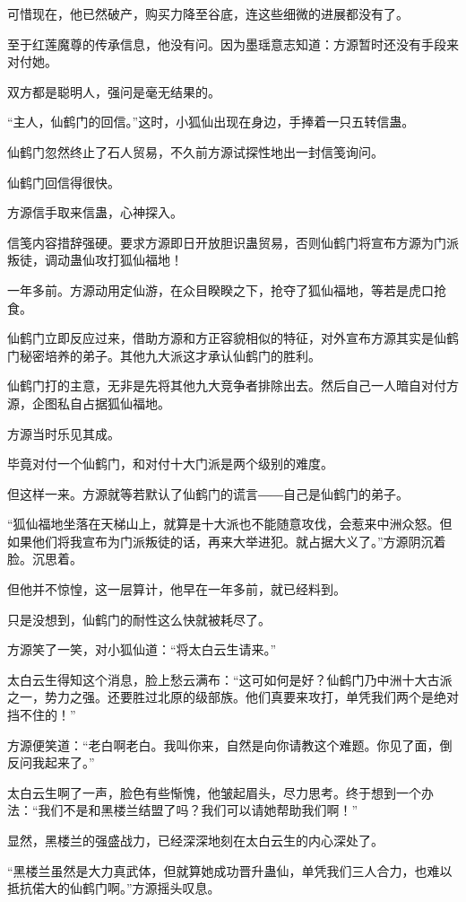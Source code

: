 \begin{this_body}
可惜现在，他已然破产，购买力降至谷底，连这些细微的进展都没有了。

至于红莲魔尊的传承信息，他没有问。因为墨瑶意志知道：方源暂时还没有手段来对付她。

双方都是聪明人，强问是毫无结果的。

“主人，仙鹤门的回信。”这时，小狐仙出现在身边，手捧着一只五转信蛊。

仙鹤门忽然终止了石人贸易，不久前方源试探性地出一封信笺询问。

仙鹤门回信得很快。

方源信手取来信蛊，心神探入。

信笺内容措辞强硬。要求方源即日开放胆识蛊贸易，否则仙鹤门将宣布方源为门派叛徒，调动蛊仙攻打狐仙福地！

一年多前。方源动用定仙游，在众目睽睽之下，抢夺了狐仙福地，等若是虎口抢食。

仙鹤门立即反应过来，借助方源和方正容貌相似的特征，对外宣布方源其实是仙鹤门秘密培养的弟子。其他九大派这才承认仙鹤门的胜利。

仙鹤门打的主意，无非是先将其他九大竞争者排除出去。然后自己一人暗自对付方源，企图私自占据狐仙福地。

方源当时乐见其成。

毕竟对付一个仙鹤门，和对付十大门派是两个级别的难度。

但这样一来。方源就等若默认了仙鹤门的谎言――自己是仙鹤门的弟子。

“狐仙福地坐落在天梯山上，就算是十大派也不能随意攻伐，会惹来中洲众怒。但如果他们将我宣布为门派叛徒的话，再来大举进犯。就占据大义了。”方源阴沉着脸。沉思着。

但他并不惊惶，这一层算计，他早在一年多前，就已经料到。

只是没想到，仙鹤门的耐性这么快就被耗尽了。

方源笑了一笑，对小狐仙道：“将太白云生请来。”

太白云生得知这个消息，脸上愁云满布：“这可如何是好？仙鹤门乃中洲十大古派之一，势力之强。还要胜过北原的级部族。他们真要来攻打，单凭我们两个是绝对挡不住的！”

方源便笑道：“老白啊老白。我叫你来，自然是向你请教这个难题。你见了面，倒反问我起来了。”

太白云生啊了一声，脸色有些惭愧，他皱起眉头，尽力思考。终于想到一个办法：“我们不是和黑楼兰结盟了吗？我们可以请她帮助我们啊！”

显然，黑楼兰的强盛战力，已经深深地刻在太白云生的内心深处了。

“黑楼兰虽然是大力真武体，但就算她成功晋升蛊仙，单凭我们三人合力，也难以抵抗偌大的仙鹤门啊。”方源摇头叹息。


\end{this_body}
